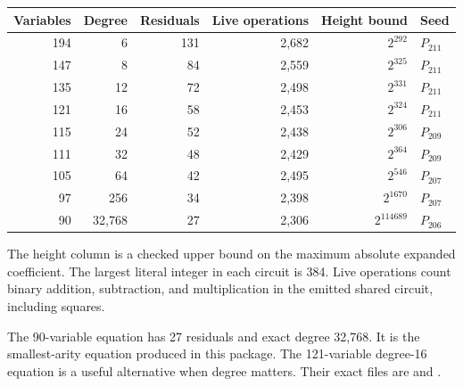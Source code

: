 \begin{center}\small
\begin{tabular}{rrrrrl}
\toprule
Variables & Degree & Residuals & Live operations & Height bound & Seed\\\midrule
194 & 6 & 131 & 2,682 & $2^{292}$ & $P_{211}$\\
147 & 8 & 84 & 2,559 & $2^{325}$ & $P_{211}$\\
135 & 12 & 72 & 2,498 & $2^{331}$ & $P_{211}$\\
121 & 16 & 58 & 2,453 & $2^{324}$ & $P_{211}$\\
115 & 24 & 52 & 2,438 & $2^{306}$ & $P_{209}$\\
111 & 32 & 48 & 2,429 & $2^{364}$ & $P_{209}$\\
105 & 64 & 42 & 2,495 & $2^{546}$ & $P_{207}$\\
97 & 256 & 34 & 2,398 & $2^{1670}$ & $P_{207}$\\
90 & 32,768 & 27 & 2,306 & $2^{114689}$ & $P_{206}$\\
\bottomrule\end{tabular}\end{center}
The height column is a checked upper bound on the maximum absolute expanded coefficient. 
The largest literal integer in each circuit is 384. Live operations count binary 
addition, subtraction, and multiplication in the emitted shared circuit, including squares.

The 90-variable equation has 27 residuals and exact degree 32,768. 
It is the smallest-arity equation produced in this package. The 121-variable 
degree-16 equation is a useful alternative when degree matters. Their exact files are 
 and 
.
